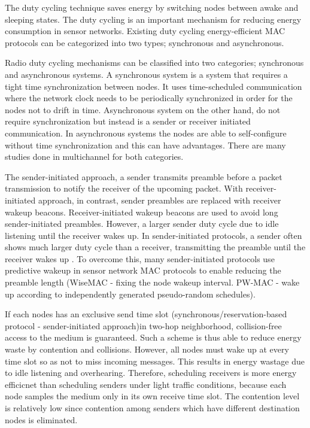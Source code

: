 The duty cycling technique saves energy by switching nodes between awake and sleeping states. The duty cycling is an important mechanism for reducing energy consumption in sensor networks. Existing duty cycling energy-efficient MAC protocols can be categorized into two types; synchronous and asynchronous.

Radio duty cycling mechanisms can be classified into two categories; synchronous and asynchronous systems. A synchronous system is a system that requires a tight time synchronization between nodes. It uses time-scheduled communication where the network clock needs to be periodically synchronized in order for the nodes not to drift in time. Asynchronous system on the other hand, do not require synchronization but instead is a sender or receiver initiated communication. In asynchronous systems the nodes are able to self-configure without time synchronization and this can have advantages. There are many studies done in multichannel for both categories.

The sender-initiated approach, a sender transmits preamble before a packet transmission to notify the receiver of the upcoming packet. With receiver-initiated approach, in contrast, sender preambles are replaced with receiver wakeup beacons. Receiver-initiated wakeup beacons are used to avoid long sender-initiated preambles. However, a larger sender duty cycle due to idle listening until the receiver wakes up. In sender-initiated protocols, a sender often shows much larger duty cycle than a receiver, transmitting the preamble until the receiver wakes up \cite{pwmac}. To overcome this, many sender-initiated protocols use predictive wakeup in sensor network MAC protocols to enable reducing the preamble length (WiseMAC - fixing the node wakeup interval. PW-MAC - wake up according to independently generated pseudo-random schedules).

If each nodes has an exclusive send time slot (synchronous/reservation-based protocol - sender-initiated approach)in two-hop neighborhood, collision-free access to the medium is guaranteed. Such a scheme is thus able to reduce energy waste by contention and collisions. However, all nodes must wake up at every time slot so as not to miss incoming messages. This results in energy wastage due to idle listening and overhearing. Therefore, scheduling receivers is more energy efficicnet than scheduling senders under light traffic conditions, because each node samples the medium only in its own receive time slot. The contention level is relatively low since contention among senders which have different destination nodes is eliminated. \cite{y-mac}

